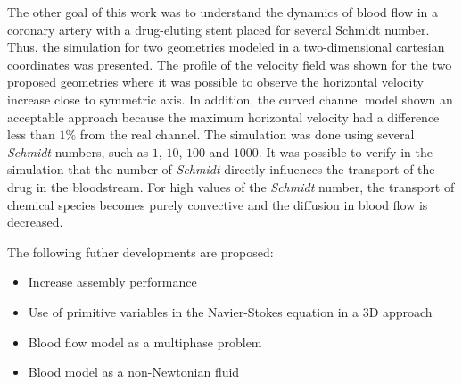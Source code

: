 \medskip
The other goal of this work was to understand the dynamics of blood 
flow in a coronary artery with 
a drug-eluting stent placed for several Schmidt number. Thus, the simulation for two geometries 
modeled in a two-dimensional cartesian coordinates was presented. 
The profile of the velocity field was shown for the two proposed 
geometries where it was possible to observe the horizontal
velocity increase close to symmetric axis. In addition,
the curved channel model shown an acceptable approach because
the maximum horizontal velocity had a difference less than $1\%$ 
from the real channel.  
The simulation was done using several \textit{Schmidt} numbers, 
such as $1$, $10$, $100$ and $1000$. It was possible to verify in the 
simulation that the number of \textit{Schmidt} directly influences 
the transport of the drug in the bloodstream. For high values of 
the \textit{Schmidt} number, the transport of chemical species 
becomes purely convective and the diffusion in blood flow is decreased. 

\vspace{0.7cm}
\noindent
The following futher developments are proposed:

\begin{itemize}
 \vspace{-0.3cm}
 \item Increase assembly performance

 \item Use of primitive variables in the Navier-Stokes equation in a 3D approach
 
 \item Blood flow model as a multiphase problem

 \item Blood model as a non-Newtonian fluid
\end{itemize}








